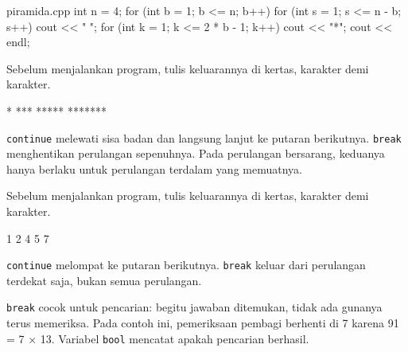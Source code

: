 \documentclass[a4paper]{article}
\begin{document}
\begin{MKode}{piramida.cpp}
int n = 4;
for (int b = 1; b <= n; b++) {
    for (int s = 1; s <= n - b; s++) {
        cout << " ";
    }
    for (int k = 1; k <= 2 * b - 1; k++) {
        cout << "*";
    }
    cout << endl;
}
\end{MKode}
\begin{Tebak}[]
Sebelum menjalankan program, tulis keluarannya di kertas, karakter demi karakter.
\end{Tebak}
\begin{Jawaban}[]
\begin{MKeluaran}[]
   *
  ***
 *****
*******
\end{MKeluaran}

\end{Jawaban}
\texttt{continue} melewati sisa badan dan langsung lanjut ke putaran berikutnya. \texttt{break} menghentikan perulangan sepenuhnya. Pada perulangan bersarang, keduanya hanya berlaku untuk perulangan terdalam yang memuatnya.

\begin{Tebak}[]
Sebelum menjalankan program, tulis keluarannya di kertas, karakter demi karakter.
\end{Tebak}
\begin{Jawaban}[]
\begin{MKeluaran}[]
1 2 4 5 7 
\end{MKeluaran}
\texttt{continue} melompat ke putaran berikutnya. \texttt{break} keluar dari perulangan terdekat saja, bukan semua perulangan.
\end{Jawaban}
\texttt{break} cocok untuk pencarian: begitu jawaban ditemukan, tidak ada gunanya terus memeriksa. Pada contoh ini, pemeriksaan pembagi berhenti di 7 karena 91 = 7 × 13. Variabel \texttt{bool} mencatat apakah pencarian berhasil.
\end{document}
